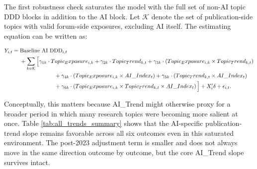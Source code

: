 \documentclass[11pt]{article}
\begin{document}
The first robustness check saturates the model with the full set of non-AI topic DDD blocks in addition to the AI block. Let $\mathcal{K}$ denote the set of publication-side topics with valid forum-side exposures, excluding AI itself. The estimating equation can be written as:

\begin{equation}
\begin{aligned}
Y_{i,t} ={}& \text{Baseline AI DDD}_{i,t} \\
&+ \sum_{k \in \mathcal{K}}
\Big[
\gamma_{1k} \cdot Topic_Exposure_{i,k}
+ \gamma_{2k} \cdot Topic_Trend_{k,t}
+ \gamma_{3k} \cdot \left(Topic_Exposure_{i,k} \times Topic_Trend_{k,t}\right) \\
&\hspace{2.2cm}
+ \gamma_{4k} \cdot \left(Topic_Exposure_{i,k} \times AI\_Index_t\right)
+ \gamma_{5k} \cdot \left(Topic_Trend_{k,t} \times AI\_Index_t\right) \\
&\hspace{2.2cm}
+ \gamma_{6k} \cdot \left(Topic_Exposure_{i,k} \times Topic_Trend_{k,t} \times AI\_Index_t\right)
\Big]
+ X_i' \delta + \epsilon_{i,t}.
\end{aligned}
\end{equation}

Conceptually, this matters because AI\_Trend might otherwise proxy for a broader period in which many research topics were becoming more salient at once. Table \ref{tab:all_trends_summary} shows that the AI-specific publication-trend slope remains favorable across all six outcomes even in this saturated environment. The post-2023 adjustment term is smaller and does not always move in the same direction outcome by outcome, but the core AI\_Trend slope survives intact.

\begin{table}[!htbp]
    \centering
    \caption{Expanded Topic-Trend Controls: Preferred Full Specification}
    \label{tab:all_trends_summary}
    \scriptsize
    \setlength{\tabcolsep}{4pt}
    \renewcommand{\arraystretch}{0.95}
    {\captionsetup{justification=raggedright,singlelinecheck=false}
    \caption*{\footnotesize Notes: Significance is based on year-clustered standard errors. * \(p<0.1\), ** \(p<0.05\), *** \(p<0.01\).}}
\end{table}
\end{document}
